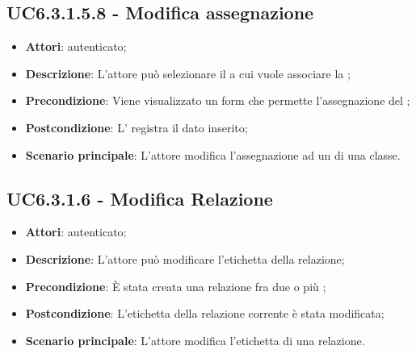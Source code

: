 \subsection{UC6.3.1.5.8 - Modifica assegnazione }
\label{ssec:UC6.3.1.5.8}
\begin{itemize}
\item \textbf{Attori}:  autenticato;
\item \textbf{Descrizione}: L'attore può selezionare il  a cui vuole associare la ;
\item \textbf{Precondizione}: Viene visualizzato un form che permette l'assegnazione del ;
\item \textbf{Postcondizione}: L' registra il dato inserito;
\item \textbf{Scenario principale}: L'attore modifica l'assegnazione ad un  di una classe.
\end{itemize}
\subsection{UC6.3.1.6 - Modifica Relazione}
\label{ssec:UC6.3.1.6}
\begin{itemize}
\item \textbf{Attori}:  autenticato;
\item \textbf{Descrizione}: L'attore può modificare l'etichetta della relazione;
\item \textbf{Precondizione}: È stata creata una relazione fra due o più ;
\item \textbf{Postcondizione}: L'etichetta della relazione corrente è stata modificata;
\item \textbf{Scenario principale}: L'attore modifica l'etichetta di una relazione.
\end{itemize}

